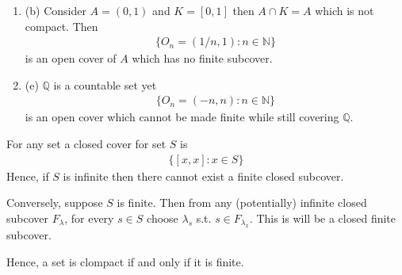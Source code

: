 \begin{enumerate}[label=]
    \item (b)
    Consider $A=(0,1)$ and $K=[0,1]$ then $A\cap K=A$ which is not
    compact. Then 
    \begin{align*}
        \{O_n = (1/n,1) : n\in \mathbb{N}\}
    \end{align*}
    is an open cover of $A$ which has no finite subcover.

    \item (e)
    $\mathbb{Q}$ is a countable set yet
    \begin{align*}
        \{O_n = (-n,n) : n\in \mathbb{N}\}
    \end{align*}
    is an open cover which cannot be made finite while still covering $\mathbb{Q}$.
\end{enumerate}

For any set a closed cover for set $S$ is
\begin{align*}
    \{ [x,x] : x\in S \}
\end{align*}
Hence, if $S$ is infinite then there cannot exist a finite closed subcover.

Conversely, suppose $S$ is finite. Then from any (potentially) infinite closed 
subcover ${F_\lambda}$, for every $s\in S$ choose $\lambda_s$ s.t. $s\in F_{\lambda_x}$.
This is will be a closed finite subcover.

Hence, a set is clompact if and only if it is finite.